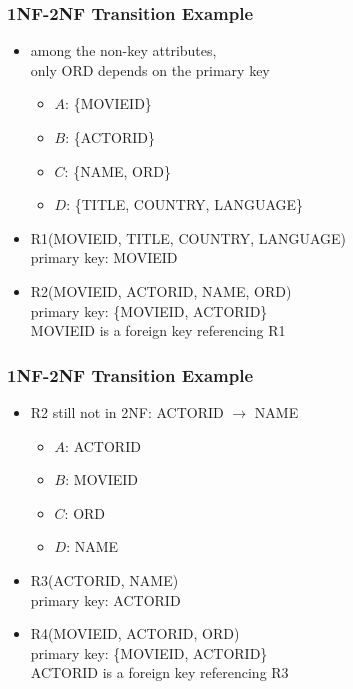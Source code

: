\documentclass[dvipsnames]{beamer}
\begin{document}
\begin{frame}
  \frametitle{1NF-2NF Transition Example}

  \begin{itemize}
    \item among the non-key attributes,\\
      only ORD depends on the primary key
    \begin{itemize}
      \item $A$: \{MOVIEID\}
      \item $B$: \{ACTORID\}
      \item $C$: \{NAME, ORD\}
      \item $D$: \{TITLE, COUNTRY, LANGUAGE\}
    \end{itemize}

    \pause
    \medskip
    \item R1(MOVIEID, TITLE, COUNTRY, LANGUAGE)\\
      primary key: MOVIEID

    \item R2(MOVIEID, ACTORID, NAME, ORD)\\
      primary key: \{MOVIEID, ACTORID\}\\
      MOVIEID is a foreign key referencing R1
  \end{itemize}
\end{frame}

\begin{frame}
  \frametitle{1NF-2NF Transition Example}

  \begin{itemize}
    \item R2 still not in 2NF: ACTORID $\rightarrow$ NAME
    \begin{itemize}
      \item $A$: ACTORID
      \item $B$: MOVIEID
      \item $C$: ORD
      \item $D$: NAME
    \end{itemize}

    \pause
    \medskip
    \item R3(ACTORID, NAME)\\
      primary key: ACTORID

    \item R4(MOVIEID, ACTORID, ORD)\\
      primary key: \{MOVIEID, ACTORID\}\\
      ACTORID is a foreign key referencing R3
  \end{itemize}
\end{frame}
\end{document}
